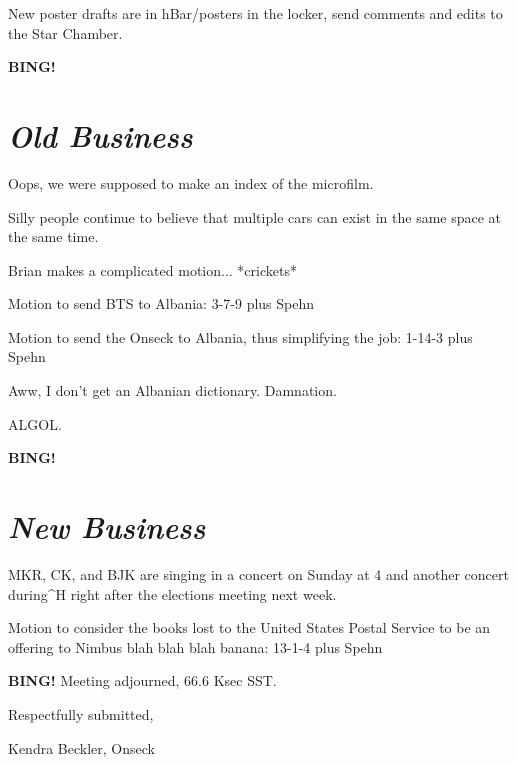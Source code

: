 \documentclass[10pt]{article}
\newcommand{\bing}{{\bf BING!} }
\newcommand{\goto}[1]{\bing \vskip 12pt \section*{{\em{#1}}}}
\newcommand{\ps}{ plus Spehn\xspace}
\newcommand{\onseck}{Kendra Beckler, Onseck}
\begin{document}
New poster drafts are in hBar/posters in the locker, send comments and edits to the Star Chamber.

\goto{Old Business}

Oops, we were supposed to make an index of the microfilm.

Silly people continue to believe that multiple cars can exist in the same space at the same time.

Brian makes a complicated motion... *crickets*

Motion to send BTS to Albania: 3-7-9 \ps

Motion to send the Onseck to Albania, thus simplifying the job: 1-14-3 \ps

Aww, I don't get an Albanian dictionary.  Damnation.

ALGOL.

\goto{New Business}

MKR, CK, and BJK are singing in a concert on Sunday at 4 and another concert during^H right after the elections meeting next week.

Motion to consider the books lost to the United States Postal Service to be an offering to Nimbus blah blah blah banana: 13-1-4 \ps

\bing
\noindent
Meeting adjourned, 66.6 Ksec SST.

\vspace{18pt}

\centerline{Respectfully submitted,}
\centerline{\onseck}
\end{document}
